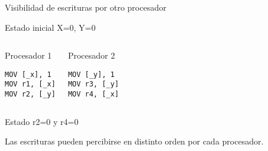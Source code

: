 \begin{frame}[t,fragile]{Visibilidad de escrituras por otro procesador}

\begin{block}{Estado inicial}
X=0, Y=0
\end{block}


\begin{columns}[T]


\begin{block}{Procesador 1}
\begin{lstlisting}[language={[x86masm]Assembler}]
MOV [_x], 1
MOV r1, [_x]
MOV r2, [_y]
\end{lstlisting}
\end{block}

\begin{block}{Procesador 2}
\begin{lstlisting}[language={[x86masm]Assembler}]
MOV [_y], 1
MOV r3, [_y]
MOV r4, [_x]
\end{lstlisting}
\end{block}

\end{columns}


\begin{block}{Estado }
r2=0 y r4=0
\end{block}

{\footnotesize Las escrituras pueden percibirse en distinto orden por cada procesador.}

\end{frame}



